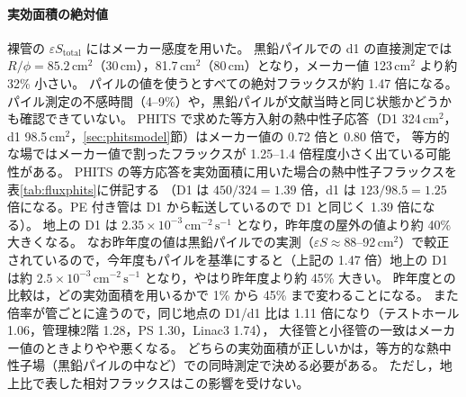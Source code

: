 \documentclass[a4paper,11pt]{ltjsarticle}
\newcommand{\flux}{\mathrm{cm^{-2}\,s^{-1}}}
\begin{document}
\paragraph{実効面積の絶対値}
裸管の $\varepsilon S_{\mathrm{total}}$ にはメーカー感度を用いた。
黒鉛パイルでの d1 の直接測定では $R/\phi=85.2$\,cm$^2$（30\,cm），81.7\,cm$^2$（80\,cm）となり，メーカー値 123\,cm$^2$ より約 32\% 小さい。
パイルの値を使うとすべての絶対フラックスが約 1.47 倍になる。パイル測定の不感時間（4--9\%）や，黒鉛パイルが文献当時と同じ状態かどうかも確認できていない。
PHITS で求めた等方入射の熱中性子応答（D1 324\,cm$^2$，d1 98.5\,cm$^2$，\ref{sec:phitsmodel}節）はメーカー値の 0.72 倍と 0.80 倍で，
等方的な場ではメーカー値で割ったフラックスが 1.25--1.4 倍程度小さく出ている可能性がある。
PHITS の等方応答を実効面積に用いた場合の熱中性子フラックスを表\ref{tab:fluxphits}に併記する
（D1 は $450/324=1.39$ 倍，d1 は $123/98.5=1.25$ 倍になる。PE 付き管は D1 から転送しているので D1 と同じく 1.39 倍になる）。
地上の D1 は $2.35\times10^{-3}\,\flux$ となり，昨年度の屋外の値より約 40\% 大きくなる。
なお昨年度の値は黒鉛パイルでの実測（$\varepsilon S\approx88$--92\,cm$^2$）で較正されているので，今年度もパイルを基準にすると（上記の 1.47 倍）地上の D1 は約 $2.5\times10^{-3}\,\flux$ となり，やはり昨年度より約 45\% 大きい。
昨年度との比較は，どの実効面積を用いるかで 1\% から 45\% まで変わることになる。
また倍率が管ごとに違うので，同じ地点の D1/d1 比は 1.11 倍になり（テストホール 1.06，管理棟2階 1.28，PS 1.30，Linac3 1.74），
大径管と小径管の一致はメーカー値のときよりやや悪くなる。
どちらの実効面積が正しいかは，等方的な熱中性子場（黒鉛パイルの中など）での同時測定で決める必要がある。
ただし，地上比で表した相対フラックスはこの影響を受けない。
\end{document}
